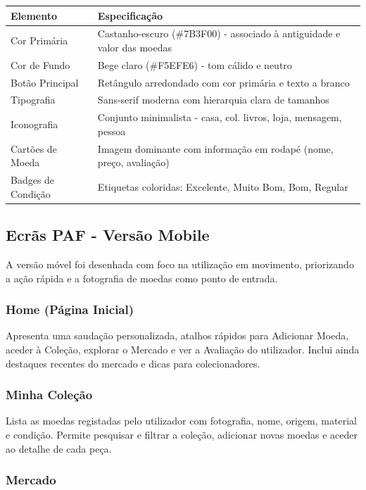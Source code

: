 \documentclass[12pt,a4paper]{article}
\begin{document}
\begin{longtable}{>{\raggedright\arraybackslash}p{} >{\raggedright\arraybackslash}p{}}
\toprule
\textbf{Elemento} & \textbf{Especificação} \\
\midrule
Cor Primária & Castanho-escuro (\#7B3F00) - associado à antiguidade e valor das moedas \\
Cor de Fundo & Bege claro (\#F5EFE6) - tom cálido e neutro \\
Botão Principal & Retângulo arredondado com cor primária e texto a branco \\
Tipografia & Sans-serif moderna com hierarquia clara de tamanhos \\
Iconografia & Conjunto minimalista - casa, col. livros, loja, mensagem, pessoa \\
Cartões de Moeda & Imagem dominante com informação em rodapé (nome, preço, avaliação) \\
Badges de Condição & Etiquetas coloridas: Excelente, Muito Bom, Bom, Regular \\
\bottomrule
\end{longtable}

\subsection{Ecrãs PAF - Versão Mobile}

A versão móvel foi desenhada com foco na utilização em movimento, priorizando a ação rápida e a fotografia de moedas como ponto de entrada.

\subsubsection{Home (Página Inicial)}

Apresenta uma saudação personalizada, atalhos rápidos para Adicionar Moeda, aceder à Coleção, explorar o Mercado e ver a Avaliação do utilizador. Inclui ainda destaques recentes do mercado e dicas para colecionadores.

\subsubsection{Minha Coleção}

Lista as moedas registadas pelo utilizador com fotografia, nome, origem, material e condição. Permite pesquisar e filtrar a coleção, adicionar novas moedas e aceder ao detalhe de cada peça.

\subsubsection{Mercado}
\end{document}
